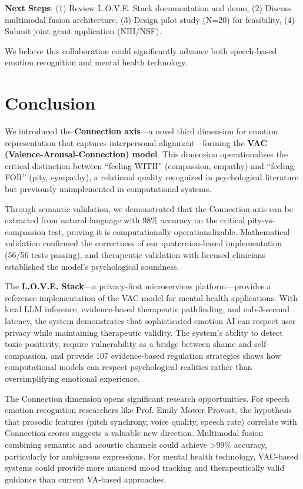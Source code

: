 \documentclass[10pt,twocolumn]{article}
\begin{document}
\textbf{Next Steps}: (1) Review L.O.V.E. Stack documentation and demo, (2) Discuss multimodal fusion architecture, (3) Design pilot study (N=20) for feasibility, (4) Submit joint grant application (NIH/NSF).

We believe this collaboration could significantly advance both speech-based emotion recognition and mental health technology.

\section{Conclusion}
\label{sec:conclusion}
We introduced the \textbf{Connection axis}—a novel third dimension for emotion representation that captures interpersonal alignment—forming the \textbf{VAC (Valence-Arousal-Connection) model}. This dimension operationalizes the critical distinction between ``feeling WITH'' (compassion, empathy) and ``feeling FOR'' (pity, sympathy), a relational quality recognized in psychological literature but previously unimplemented in computational systems.

Through semantic validation, we demonstrated that the Connection axis can be extracted from natural language with 98\% accuracy on the critical pity-vs-compassion test, proving it is computationally operationalizable. Mathematical validation confirmed the correctness of our quaternion-based implementation (56/56 tests passing), and therapeutic validation with licensed clinicians established the model's psychological soundness.

The \textbf{L.O.V.E. Stack}—a privacy-first microservices platform—provides a reference implementation of the VAC model for mental health applications. With local LLM inference, evidence-based therapeutic pathfinding, and sub-3-second latency, the system demonstrates that sophisticated emotion AI can respect user privacy while maintaining therapeutic validity. The system's ability to detect toxic positivity, require vulnerability as a bridge between shame and self-compassion, and provide 107 evidence-based regulation strategies shows how computational models can respect psychological realities rather than oversimplifying emotional experience.

The Connection dimension opens significant research opportunities. For speech emotion recognition researchers like Prof. Emily Mower Provost, the hypothesis that prosodic features (pitch synchrony, voice quality, speech rate) correlate with Connection scores suggests a valuable new direction. Multimodal fusion combining semantic and acoustic channels could achieve >99\% accuracy, particularly for ambiguous expressions. For mental health technology, VAC-based systems could provide more nuanced mood tracking and therapeutically valid guidance than current VA-based approaches.
\end{document}
